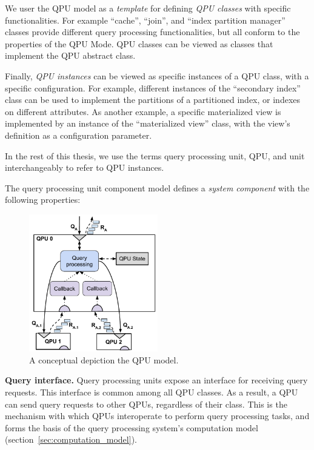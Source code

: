We user the QPU model as a \textit{template} for defining \textit{QPU classes} with specific functionalities.
For example ``cache'', ``join'', and ``index partition manager'' classes provide different query processing functionalities,
but all conform to the properties of the QPU Mode.
QPU classes can be viewed as classes that implement the QPU abstract class.

Finally, \textit{QPU instances} can be viewed as specific instances of a QPU class,
with a specific configuration.
For example, different instances of the ``secondary index'' class can be used to
implement the partitions of a partitioned index,
or indexes on different attributes.
As another example, a specific materialized view is implemented by an instance of the
``materialized view'' class,
with the view's definition as a configuration parameter.

In the rest of this thesis, we use the terms query processing unit, QPU, and unit interchangeably to refer to QPU instances.

\bigskip
\noindent
The query processing unit component model defines a \textit{system component} with the following properties:

\begin{figure}[t]
  \centering
    \includegraphics[width=0.5\textwidth]{./figures/design_pattern/qpu_abstraction.pdf}
  \caption{A conceptual depiction the QPU model.}
  \label{fig:qpu_abstraction}
\end{figure}

\medskip
\noindent
\textbf{Query interface.}
Query processing units expose an interface for receiving query requests.
This interface is common among all QPU classes.
As a result, a QPU can send query requests to other QPUs, regardless of their class.
This is the mechanism with which QPUs interoperate to perform query processing tasks,
and forms the basis of the query processing system's computation model (section~\ref{sec:computation_model}).


